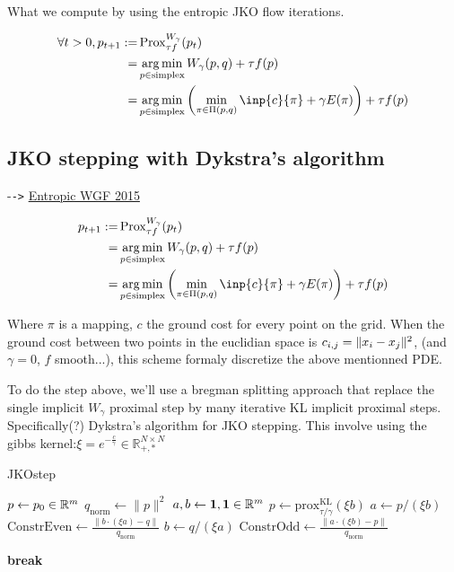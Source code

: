 What we compute by using the entropic JKO flow iterations.

\begin{align}
	\forall t > 0, p_{t+1} := & \prox^{W_{\gamma}}_{\tau f}(p_t) \\
							= & \argmin_{p \in \text{simplex}} W_{\gamma}(p, q) + \tau f(p) \\
							= &\argmin_{p \in \text{simplex}}  \left( \min_{\pi \in \Pi(p, q)} \inp{c}{\pi} + \gamma E(\pi) \right) + \tau f(p)
\end{align}

\subsection{JKO stepping with Dykstra's algorithm}

-\verb|->| \href{https://arxiv.org/pdf/1502.06216.pdf}{Entropic WGF 2015}

\begin{align}
p_{t+1} := & \prox^{W_{\gamma}}_{\tau f}(p_t) \\
							= & \argmin_{p \in \text{simplex}} W_{\gamma}(p, q) + \tau f(p) \\
							= &\argmin_{p \in \text{simplex}}  \left( \min_{\pi \in \Pi(p, q)} \inp{c}{\pi} + \gamma E(\pi) \right) + \tau f(p)
\end{align}

Where $\pi$ is a mapping, $c$ the ground cost for every point on the grid. When the ground cost between two points in the euclidian space is $c_{i,j} = \lVert x_i- x_j\rVert^2$, (and $\gamma=0$, $f$ smooth...), this scheme formaly discretize the above mentionned PDE.

To do the step above, we'll use a bregman splitting approach that replace the single implicit $W_\gamma$ proximal step by many iterative KL implicit proximal steps. Specifically(?) Dykstra's algorithm for JKO stepping. This involve using the gibbs kernel:$\xi = e^{-\frac{c}{\gamma}} \in \mathbb{R}^{N \times N}_{+, \ast}$


\begin{algorithm}
\caption{JKOstep}
\begin{algorithmic}[1]
\State $p \gets p_0 \in \mathbb{R}^m$
\State $q_{\text{norm}} \gets \lVert p \rVert^2$
\State $a, b \gets \mathbf{1}, \mathbf{1} \in \mathbb{R}^m$ 
\State $p \gets \text{prox}^{\text{KL}}_{\tau/\gamma}(\xi b)$
    \State $a \gets p / (\xi b)$
    \State $\text{ConstrEven} \gets \frac{\lVert b \cdot (\xi a) - q \rVert}{q_{\text{norm}}}$
    \State $b \gets q / (\xi a)$
    \State $\text{ConstrOdd} \gets \frac{\lVert a \cdot (\xi b) - p \rVert}{q_{\text{norm}}}$
    
        \State \textbf{break}
    \EndIf
\EndFor
\end{algorithmic}
\end{algorithm}

